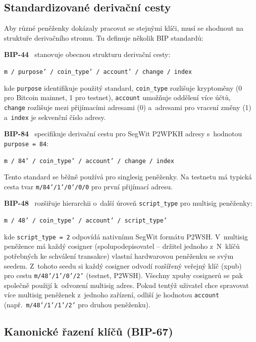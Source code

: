 \subsection{Standardizované derivační cesty}
\label{sec:derivation-paths}

Aby různé peněženky dokázaly pracovat se stejnými klíči, musí se shodnout
na struktuře derivačního stromu. Tu definuje několik BIP standardů:

\textbf{BIP-44}~\citep{BIP44} stanovuje obecnou strukturu derivační cesty:
\begin{center}
\texttt{m / purpose' / coin\_type' / account' / change / index}
\end{center}
kde \texttt{purpose} identifikuje použitý standard, \texttt{coin\_type}
rozlišuje kryptoměny (0 pro Bitcoin mainnet, 1 pro testnet),
\texttt{account} umožňuje oddělení více účtů, \texttt{change} rozlišuje mezi
přijímacími adresami (0) a~adresami pro vracení změny (1) a~\texttt{index}
je sekvenční číslo adresy.

\textbf{BIP-84}~\citep{BIP84} specifikuje derivační cestu pro SegWit P2WPKH
adresy s~hodnotou \texttt{purpose = 84}:
\begin{center}
\texttt{m / 84' / coin\_type' / account' / change / index}
\end{center}
Tento standard se běžně používá pro singlesig peněženky. Na testnetu má
typická cesta tvar \texttt{m/84'/1'/0'/0/0} pro první přijímací adresu.

\textbf{BIP-48}~\citep{BIP48} rozšiřuje hierarchii o~další úroveň
\texttt{script\_type} pro multisig peněženky:
\begin{center}
\texttt{m / 48' / coin\_type' / account' / script\_type'}
\end{center}
kde \texttt{script\_type = 2} odpovídá nativnímu SegWit formátu P2WSH.
V~multisig peněžence má každý cosigner (spolupodepisovatel -- držitel jednoho
z~N~klíčů potřebných ke schválení transakce) vlastní hardwarovou peněženku
se svým seedem. Z~tohoto seedu si každý cosigner odvodí rozšířený veřejný klíč
(xpub) pro cestu \texttt{m/48'/1'/0'/2'} (testnet, P2WSH). Všechny xpuby
cosignerů se pak společně použijí k~odvození multisig adres. Pokud tentýž
uživatel chce spravovat více multisig peněženek z~jednoho zařízení, odliší je
hodnotou \texttt{account} (např.\ \texttt{m/48'/1'/1'/2'} pro druhou peněženku).

\subsection{Kanonické řazení klíčů (BIP-67)}
\label{sec:bip67}

